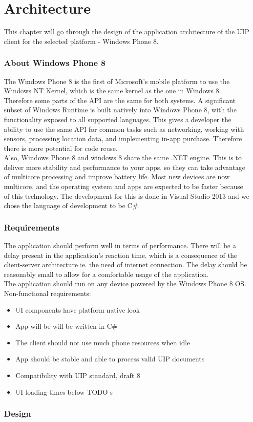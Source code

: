 \chapter{Architecture}
This chapter will go through the design of the application architecture of the UIP client for the selected platform - Windows Phone 8.

\subsection{About Windows Phone 8}
The Windows Phone 8 is the first of Microsoft's mobile platform to use the Windows NT Kernel, which is the same kernel as the one in Windows 8. Therefore some parts of the API are the same for both systems. A significant subset of Windows Runtime is built natively into Windows Phone 8, with the functionality exposed to all supported languages. This gives a developer the ability to use the same API for common tasks such as networking, working with sensors, processing location data, and implementing in-app purchase. Therefore there is more potential for code reuse.\\
Also, Windows Phone 8 and windows 8 share the same .NET engine. This is to deliver more stability and performance to your apps, so they can take advantage of multicore processing and improve battery life. Most new devices are now multicore, and the operating system and apps are expected to be faster because of this technology. The development for this is done in Visual Studio 2013 and we chose the language of development to be C\#.

\subsection{Requirements}
The application should perform well in terms of performance. There will be a delay present in the application's reaction time, which is a consequence of the client-server architecture ie. the need of internet connection. The delay should be reasonably small to allow for a comfortable usage of the application.
\\
The application should run on any device powered by the Windows Phone 8 OS.
\newline
\\
Non-functional requirements:
\begin{itemize}
  \item UI components have platform native look
  \item App will be will be written in C\#
  \item The client should not use much phone resources when idle
  \item App should be stable and able to process valid UIP documents
  \item Compatibility with UIP standard, draft 8
  \item UI loading times below TODO s
\end{itemize}

\subsection{Design}
